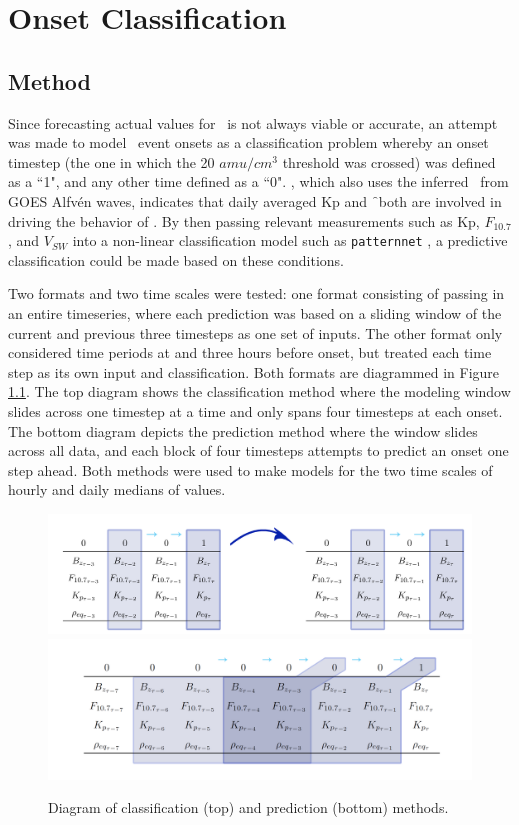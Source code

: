 \chapter[Onset Classification]{Onset Classification}

\section{Method}
Since forecasting actual values for \req\ is not always viable or accurate, an attempt was made to model \req\ event onsets as a classification problem whereby an onset timestep (the one in which the 20 $amu/cm^3$ threshold was crossed) was defined as a ``1", and any other time defined as a ``0". \cite{Denton2016}, which also uses the inferred \req\ from GOES Alfvén waves, indicates that daily averaged Kp and \f\ both are involved in driving the behavior of \req. By then passing relevant measurements such as Kp, $F_{10.7}$, and $V_{SW}$ into a non-linear classification model such as \texttt{patternnet} \citep{MATLAB:2014}, a predictive classification could be made based on these conditions. 

Two formats and two time scales were tested: one format consisting of passing in an entire timeseries, where each prediction was based on a sliding window of the current and previous three timesteps as one set of inputs. The other format only considered time periods at and three hours before onset, but treated each time step as its own input and classification. Both formats  are diagrammed in Figure \ref{fig:ClassifyDiagram}. The top diagram shows the classification method where the modeling window slides across one timestep at a time and only spans four timesteps at each onset. The bottom diagram depicts the prediction method where the window slides across all data, and each block of four timesteps attempts to predict an onset one step ahead. Both methods were used to make models for the two time scales of hourly and daily medians of values. 

\begin{figure}[htp!]
	\centering
	\includegraphics[width=1\linewidth]{Figures/CH5/ClassifyGraphic2.png}
	\includegraphics[width=1\linewidth]{Figures/CH5/FullGraphic.png}
	\caption{Diagram of classification (top) and prediction (bottom) methods.}
	\label{fig:ClassifyDiagram}
\end{figure}


